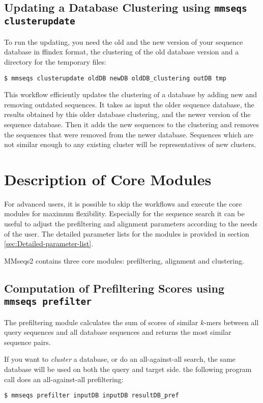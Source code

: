 \documentclass[11pt,a4paper]{scrreprt}
\begin{document}
\subsection{Updating a Database Clustering using \texttt{mmseqs clusterupdate}}
To run the updating, you need the old and the new version of your sequence database in ffindex format, the clustering of the old database version and a directory for the temporary files:

\begin{verbatim}
$ mmseqs clusterupdate oldDB newDB oldDB_clustering outDB tmp
\end{verbatim}

This workflow efficiently updates the clustering of a database by adding new and removing outdated sequences. It takes as input the older sequence database, the results obtained by this older database clustering, and the newer version of the sequence database. Then it adds the new sequences to the clustering and removes the sequences that were removed from the newer database. Sequences which are not similar enough to any existing cluster will be representatives of new clusters.
\section{Description of Core Modules}
For advanced users, it is possible to skip the workflows and execute the core modules for maximum flexibility. Especially for the sequence search it can be useful to adjust the prefiltering and alignment parameters according to the needs of the user. The detailed parameter lists for the modules is provided in section \ref{sec:Detailed-parameter-list}.

MMseqs2 contains three core modules: prefiltering, alignment and clustering.
\subsection{Computation of Prefiltering Scores using \texttt{mmseqs prefilter}} \label{sub:Prefiltering}
The prefiltering module calculates the sum of scores of similar $k$-mers between all query sequences and all database sequences and returns the most similar sequence pairs. 

If you want to \emph{cluster} a database, or do an all-against-all search, the same database will be used on both the query and target side. the following program call does an all-against-all prefiltering: 

\begin{verbatim}
$ mmseqs prefilter inputDB inputDB resultDB_pref 
\end{verbatim}
\end{document}
